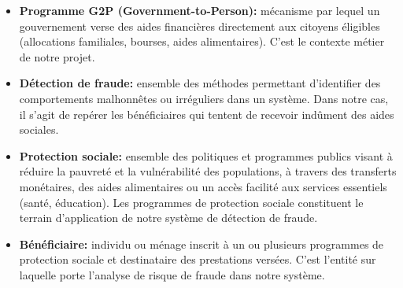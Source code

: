 \documentclass[a4paper, oneside, 12pt]{book}
\begin{document}
\begin{itemize}[label=\textbullet]

    \item \textbf{Programme G2P (Government-to-Person):} mécanisme par lequel un gouvernement verse des aides financières directement aux citoyens éligibles (allocations familiales, bourses, aides alimentaires). C'est le contexte métier de notre projet.

    \item \textbf{Détection de fraude:} ensemble des méthodes permettant d'identifier des comportements malhonnêtes ou irréguliers dans un système. Dans notre cas, il s'agit de repérer les bénéficiaires qui tentent de recevoir indûment des aides sociales.
    
    \item \textbf{Protection sociale:} ensemble des politiques et programmes publics visant à
    réduire la pauvreté et la vulnérabilité des populations, à travers des transferts monétaires,
    des aides alimentaires ou un accès facilité aux services essentiels (santé, éducation). Les
    programmes de protection sociale constituent le terrain d'application de notre système de
    détection de fraude.
    
    \item \textbf{Bénéficiaire:} individu ou ménage inscrit à un ou plusieurs programmes de protection sociale et destinataire des prestations versées. C'est l'entité sur laquelle porte l'analyse de risque de fraude dans notre système.
    

\end{itemize}
\end{document}
